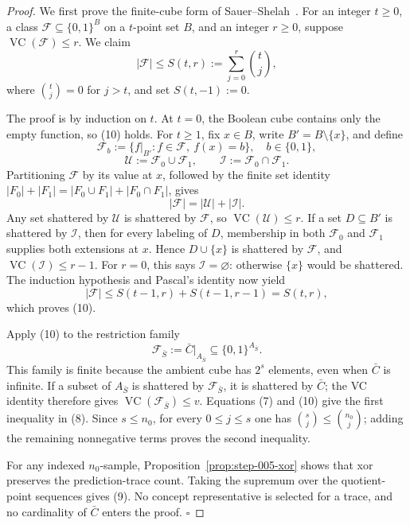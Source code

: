 \begin{proof}
We first prove the finite-cube form of Sauer--Shelah~\citep{sauer1972}.  For an
integer \(t\ge0\), a class \(\mathcal F\subseteq\{0,1\}^B\) on a
\(t\)-point set \(B\), and an integer \(r\ge0\), suppose
\(\operatorname{VC}(\mathcal F)\le r\).  We claim
\[
|\mathcal F|\le S(t,r):=\sum_{j=0}^{r}\binom{t}{j},
\tag{10}
\]
where \(\binom{t}{j}=0\) for \(j>t\), and set \(S(t,-1):=0\).

The proof is by induction on \(t\).  At \(t=0\), the Boolean cube contains
only the empty function, so (10) holds.  For \(t\ge1\), fix \(x\in B\),
write \(B'=B\setminus\{x\}\), and define
\[
\mathcal F_b:=\{f|_{B'}:f\in\mathcal F,\ f(x)=b\},\quad b\in\{0,1\},
\]
\[
\mathcal U:=\mathcal F_0\cup\mathcal F_1,
\qquad
\mathcal I:=\mathcal F_0\cap\mathcal F_1.
\tag{11}
\]
Partitioning \(\mathcal F\) by its value at \(x\), followed by the finite
set identity \(|F_0|+|F_1|=|F_0\cup F_1|+|F_0\cap F_1|\), gives
\[
|\mathcal F|=|\mathcal U|+|\mathcal I|.
\tag{12}
\]
Any set shattered by \(\mathcal U\) is shattered by \(\mathcal F\), so
\(\operatorname{VC}(\mathcal U)\le r\).  If a set \(D\subseteq B'\) is
shattered by \(\mathcal I\), then for every labeling of \(D\), membership
in both \(\mathcal F_0\) and \(\mathcal F_1\) supplies both extensions at
\(x\).  Hence \(D\cup\{x\}\) is shattered by \(\mathcal F\), and
\(\operatorname{VC}(\mathcal I)\le r-1\).  For \(r=0\), this says
\(\mathcal I=\varnothing\): otherwise \(\{x\}\) would be shattered.
The induction hypothesis and Pascal's identity now yield
\[
|\mathcal F|
\le S(t-1,r)+S(t-1,r-1)
=S(t,r),
\tag{13}
\]
which proves (10).

Apply (10) to the restriction family
\[
\mathcal F_{\bar S}:=\bar C|_{A_{\bar S}}
\subseteq\{0,1\}^{A_{\bar S}}.
\]
This family is finite because the ambient cube has \(2^s\) elements, even
when \(\bar C\) is infinite.  If a subset of \(A_{\bar S}\) is shattered
by \(\mathcal F_{\bar S}\), it is shattered by \(\bar C\); the 
VC identity therefore gives
\(\operatorname{VC}(\mathcal F_{\bar S})\le v\).  Equations (7) and (10)
give the first inequality in (8).  Since \(s\le n_0\), for every
\(0\le j\le s\) one has \(\binom{s}{j}\le\binom{n_0}{j}\); adding the
remaining nonnegative terms proves the second inequality.

For any indexed \(n_0\)-sample, Proposition~\ref{prop:step-005-xor} shows
that xor preserves the prediction-trace count.  Taking the supremum over
the quotient-point sequences gives (9).  No concept representative is
selected for a trace, and no cardinality of \(\bar C\) enters the proof.
\(\square\)


\end{proof}


